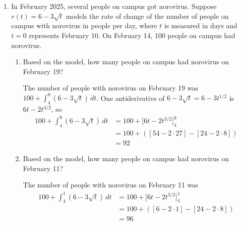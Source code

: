 \documentclass{article}
\begin{document}
\begin{enumerate}
\begin{enumerate}
  \end{enumerate}

  \pspace{\newpage}

\item \label{norovirus-rate}

  In February 2025, several people on campus got norovirus.  Suppose $r(t)
  = 6 - 3 \sqrt{t}$ models the rate of change of the number of people on
  campus with norovirus in people per day, where $t$ is measured in days
  and $t = 0$ represents February 10.  On February 14, 100 people on
  campus had norovirus.
  \begin{enumerate}
  \item
    \begin{problem}
      Based on the model, how many people on campus had norovirus on February 19?
    \end{problem}
    \pspace{\vfill}

    \begin{solution}
      The number of people with norovirus on February 19 was
      $\displaystyle 100+\int_4^9(6-3\sqrt{t})\,dt$.  One antiderivative
      of $6 - 3 \sqrt{t} = 6 - 3 t^{1/2}$ is $6t - 2 t^{3/2}$, so
      \begin{align*}
        100 + \int_4^9(6-3\sqrt{t})\,dt &= 100 + \Big[ 6t -
          2 t^{3/2} \Big]_4^9 \\
        &= 100 + \left( \left[ 54 - 2 \cdot 27 \right] - \left[ 24
            - 2 \cdot 8 \right] \right) \\
        &= \boxed{92}
      \end{align*}
    \end{solution}

  \item
    \begin{problem}
      Based on the model, how many people on campus had norovirus on February 11?
    \end{problem}
    \pspace{\vfill}

    \begin{solution}
      The number of people with norovirus on February 11 was
      \begin{align*}
        100 + \int_4^1(6-3\sqrt{t})\,dt &= 100 + \Big[ 6t -
          2 t^{3/2} \Big]_4^1 \\
        &= 100 + \left( \left[ 6 - 2 \cdot 1 \right] - \left[ 24
            - 2 \cdot 8 \right] \right) \\
        &= \boxed{96}
      \end{align*}
    \end{solution}


\end{enumerate}
\end{enumerate}
\end{document}
